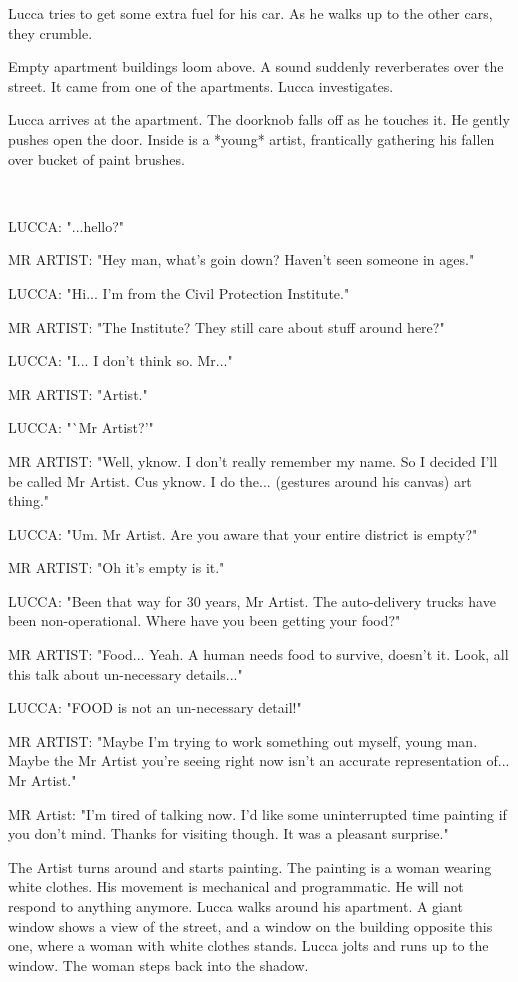 \documentclass[11pt]{article}
\begin{document}
Lucca tries to get some extra fuel for his car.
As he walks up to the other cars, they crumble. 

Empty apartment buildings loom above. 
A sound suddenly reverberates over the street. 
It came from one of the apartments.
Lucca investigates.

Lucca arrives at the apartment.
The doorknob falls off as he touches it.
He gently pushes open the door.
Inside is a *young* artist, frantically gathering his fallen over bucket of paint brushes. 

\ 
 
LUCCA: "...hello?"

MR ARTIST: "Hey man, what's goin down?
Haven't seen someone in ages."

LUCCA: "Hi... I'm from the Civil Protection Institute."

MR ARTIST: "The Institute? 
They still care about stuff around here?"

LUCCA: "I... I don't think so. Mr..."

MR ARTIST: "Artist."

LUCCA: "`Mr Artist?'"

MR ARTIST: "Well, yknow. 
I don't really remember my name. So I decided I'll be called Mr Artist.
Cus yknow. I do the... (gestures around his canvas) art thing."

LUCCA: "Um. Mr Artist. Are you aware that your entire district is empty?"

MR ARTIST: "Oh it's empty is it."

LUCCA: "Been that way for 30 years, Mr Artist.
The auto-delivery trucks have been non-operational. 
Where have you been getting your food?"

MR ARTIST: "Food... Yeah. A human needs food to survive, doesn't it.
Look, all this talk about un-necessary details..."

LUCCA: "FOOD is not an un-necessary detail!"

MR ARTIST: "Maybe I'm trying to work something out myself, young man. 
Maybe the Mr Artist you're seeing right now isn't an accurate representation of... Mr Artist."

MR Artist: "I’m tired of talking now. 
I’d like some uninterrupted time painting if you don’t mind. 
Thanks for visiting though. 
It was a pleasant surprise."

The Artist turns around and starts painting. 
The painting is a woman wearing white clothes. 
His movement is mechanical and programmatic. 
He will not respond to anything anymore. 
Lucca walks around his apartment. 
A giant window shows a view of the street, and a window on the building opposite this one, where a woman with white clothes stands. 
Lucca jolts and runs up to the window. 
The woman steps back into the shadow. 
\end{document}
